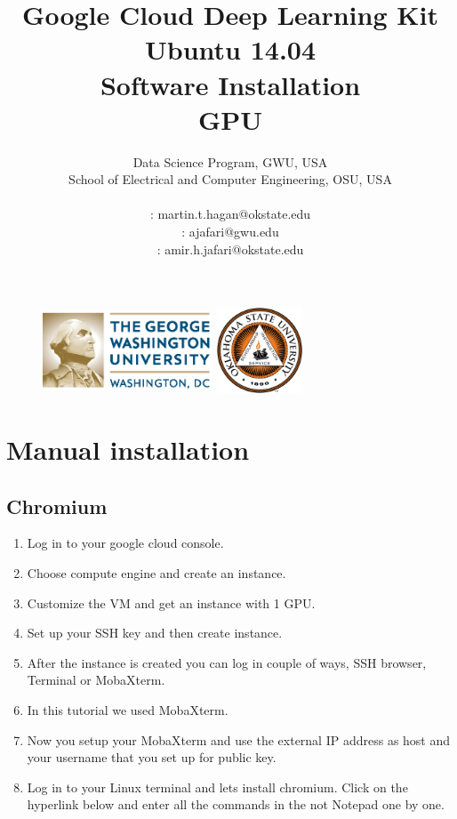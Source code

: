 \documentclass[12pt]{article}
\title{\textbf{Google Cloud Deep Learning Kit\\ Ubuntu 14.04 \\ Software Installation\\ GPU }}%
\author{Data Science Program, GWU, USA \\
School of Electrical and Computer Engineering, OSU, USA\\
\vspace{1cm}\\
\Letter : martin.t.hagan@okstate.edu\\
\Letter : ajafari@gwu.edu\\
\Letter : amir.h.jafari@okstate.edu  }
\begin{document}
\begin{figure}
\centering \includegraphics[width=2in, height=1in]{fig/GW_logo.eps}\hfill
\centering \includegraphics[width=1in, height=1in]{fig/logo1.eps}\hfill
\end{figure}

\maketitle
\newpage
\tableofcontents
\newpage

\section{Manual installation}
\subsection{Chromium}

\begin{enumerate}
  \item Log in to your google cloud console.
  \item Choose compute engine and create an instance.
  \item Customize the VM and get an instance with 1 GPU.
  \item Set up your SSH key and then create instance.
  \item After the instance is created you can log in couple of ways, SSH browser, Terminal or MobaXterm.
  \item In this tutorial we used MobaXterm.
  \item Now you setup your MobaXterm and use the external IP address as host and your username that you set up for public key.
  \item Log in to your Linux terminal and lets install chromium. Click on the hyperlink below and enter all the commands in the not Notepad one by one.
\end{enumerate}
\end{document}
